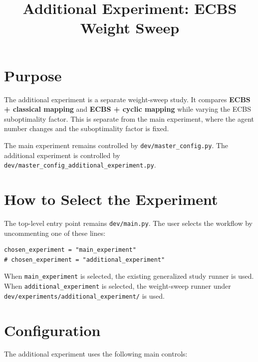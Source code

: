 \documentclass[11pt]{article}
\title{Additional Experiment: ECBS Weight Sweep}
\author{}
\date{}
\begin{document}
\maketitle

\section{Purpose}

The additional experiment is a separate weight-sweep study. It compares \textbf{ECBS + classical mapping} and \textbf{ECBS + cyclic mapping} while varying the ECBS suboptimality factor. This is separate from the main experiment, where the agent number changes and the suboptimality factor is fixed.

The main experiment remains controlled by \texttt{dev/master\_config.py}. The additional experiment is controlled by \texttt{dev/master\_config\_additional\_experiment.py}.

\section{How to Select the Experiment}

The top-level entry point remains \texttt{dev/main.py}. The user selects the workflow by uncommenting one of these lines:

\begin{lstlisting}
chosen_experiment = "main_experiment"
# chosen_experiment = "additional_experiment"
\end{lstlisting}

When \texttt{main\_experiment} is selected, the existing generalized study runner is used. When \texttt{additional\_experiment} is selected, the weight-sweep runner under \texttt{dev/experiments/additional\_experiment/} is used.

\section{Configuration}

The additional experiment uses the following main controls:
\end{document}
